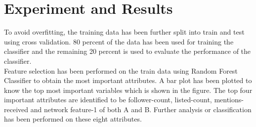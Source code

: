 \documentclass[sigconf]{acmart}
\begin{document}
\section{Experiment and Results}
To avoid overfitting, the training data has been further split into train and test using cross validation. 80 percent of the data has been used for training the classifier and the remaining 20 percent is used to evaluate the performance of the classifier. \\
Feature selection has been performed on the train data using Random Forest Classifier to obtain the most important attributes. A bar plot has been plotted to know the top most important variables which is shown in the figure. The top four important attributes are identified to be follower-count, listed-count, mentions-received and network feature-1 of both A and B. Further analysis or classification has been performed on these eight attributes.\\
\end{document}
